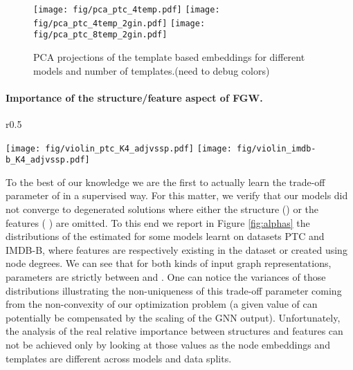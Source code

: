 \documentclass{article}
\begin{document}
\begin{figure}[t!]
	\begin{center}
		\texttt{[image: fig/pca\_ptc\_4temp.pdf]}\hspace{5mm}
		\texttt{[image: fig/pca\_ptc\_4temp\_2gin.pdf]}\hspace{5mm}
		\texttt{[image: fig/pca\_ptc\_8temp\_2gin.pdf]}
	\end{center}\vspace{-2mm}
	\caption{PCA projections of the template based embeddings for different
		models and number of templates.(need to debug colors)\label{fig:pca} }
\end{figure}
\paragraph{Importance of the structure/feature aspect of FGW.} \begin{wrapfigure}{r}{0.5\textwidth}  \vspace{-5mm}
	\begin{center}
		\texttt{[image: fig/violin\_ptc\_K4\_adjvssp.pdf]}
		\texttt{[image: fig/violin\_imdb-b\_K4\_adjvssp.pdf]}
		
	\end{center}
	\vspace{-5mm}
	\caption{\label{fig:alphas}Distributions of estimated .} 
\end{wrapfigure}
To the best of our knowledge we are the first to actually learn the
trade-off parameter  of  in a supervised way. For this matter, we
verify that our models did not converge to degenerated solutions where either
the structure () or the features ( ) are omitted. To
this end we report in Figure \ref{fig:alphas} the distributions of the estimated
 for some models learnt on datasets PTC and IMDB-B, where features are respectively existing in the dataset or created using node degrees. We can see that for both 
kinds of input graph representations,
 parameters are strictly between  and . One can notice the variances of those
distributions illustrating the non-uniqueness of this trade-off parameter coming
from the non-convexity of our optimization problem (a given value of 
can potentially be compensated by the scaling of the GNN output). Unfortunately, the
analysis of the real relative importance between structures and features can not
be achieved only by looking at those values as the node embeddings and templates
are different across models and data splits.
\end{document}
